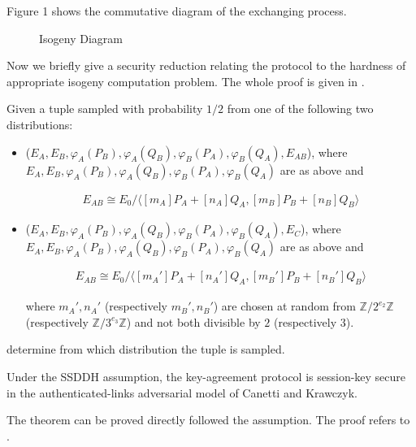 Figure 1 shows the commutative diagram of the exchanging process.

\begin{figure}[h]
\centering
{}
\caption{Isogeny Diagram}
\end{figure}


Now we briefly give a security reduction relating the protocol to the hardness of 
appropriate isogeny computation problem. The whole proof is given in \cite{PQCRYPTO:JaoDeFo11}.

 Given a tuple sampled with probability 
$1/2$ from one of the following two distributions:

\begin{itemize}
  \item ($E_A, E_B, \varphi_A(P_B), \varphi_A(Q_B), \varphi_B(P_A), \varphi_B(Q_A), E_{AB}$), where 
$E_A, E_B, \varphi_A(P_B), \varphi_A(Q_B), \varphi_B(P_A), \varphi_B(Q_A)$ are as above and 

\begin{align}
  E_{AB} \cong E_0/ \langle [m_A]P_A+[n_A]Q_A, [m_B]P_B+[n_B]Q_B \rangle
\end{align}

  \item ($E_A, E_B, \varphi_A(P_B), \varphi_A(Q_B), \varphi_B(P_A), \varphi_B(Q_A), E_{C}$), where 
$E_A, E_B, \varphi_A(P_B), \varphi_A(Q_B), \varphi_B(P_A), \varphi_B(Q_A)$ are as above and 

\begin{align}
  E_{AB} \cong E_0/ \langle [m_A']P_A+[n_A']Q_A, [m_B']P_B+[n_B']Q_B \rangle
\end{align}

where $m_A', n_A'$ (respectively 
$m_B',n_B'$) are chosen at random from $\mathbb{Z}/2^{e_2}\mathbb{Z}$ (respectively 
$\mathbb{Z}/3^{e_3}\mathbb{Z}$) and not both divisible by $2$ (respectively 
$3$).

\end{itemize}

determine from which distribution the tuple is sampled.

 Under the SSDDH assumption, the key-agreement protocol is session-key secure 
in the authenticated-links adversarial model of Canetti and Krawczyk.

The theorem can be proved directly followed the assumption. The proof refers to  \cite{PQCRYPTO:JaoDeFo11}.